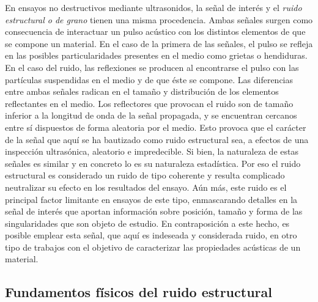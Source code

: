 En ensayos no destructivos mediante ultrasonidos, la señal de interés y el \emph{ruido estructural o de grano} tienen una misma procedencia. Ambas señales surgen como consecuencia de interactuar un pulso acústico con los distintos elementos de que se compone un material. En el caso de la primera de las señales, el pulso se refleja en las posibles particularidades presentes en el medio como grietas o hendiduras. En el caso del ruido, las reflexiones se producen al encontrarse el pulso con las partículas suspendidas en el medio y de que éste se compone. Las diferencias entre ambas señales radican en el tamaño y distribución de los elementos reflectantes en el medio. Los reflectores que provocan el ruido son de tamaño inferior a la longitud de onda de la señal propagada, y se encuentran cercanos entre sí dispuestos de forma aleatoria por el medio. Esto provoca que el carácter de la señal que aquí se ha bautizado como ruido estructural sea, a efectos de una inspección ultrasónica, aleatorio e impredecible. Si bien, la naturaleza de estas señales es similar y en concreto lo es su naturaleza estadística. Por eso el ruido estructural es considerado un ruido de tipo coherente y resulta complicado neutralizar su efecto en los resultados del ensayo. Aún más, este ruido es el principal factor limitante en ensayos de este tipo, enmascarando detalles en la señal de interés que aportan información sobre posición, tamaño y forma de las singularidades que son objeto de estudio. En contraposición a este hecho, es posible emplear esta señal, que aquí es indeseada y considerada ruido, en otro tipo de trabajos con el objetivo de caracterizar las propiedades acústicas de un material.


\subsection{Fundamentos físicos del ruido estructural}

